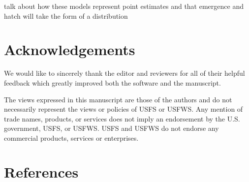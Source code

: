 \documentclass[10pt,a4paper,onecolumn]{article}
\begin{document}
talk about how these models represent point estimates and that emergence
and hatch will take the form of a distribution

\section{Acknowledgements}\label{acknowledgements}

We would like to sincerely thank the editor and reviewers for all of
their helpful feedback which greatly improved both the software and the
manuscript.

The views expressed in this manuscript are those of the authors and do
not necessarily represent the views or policies of USFS or USFWS. Any
mention of trade names, products, or services does not imply an
endorsement by the U.S. government, USFS, or USFWS. USFS and USFWS do
not endorse any commercial products, services or enterprises.

\section*{References}\label{references}
\end{document}
